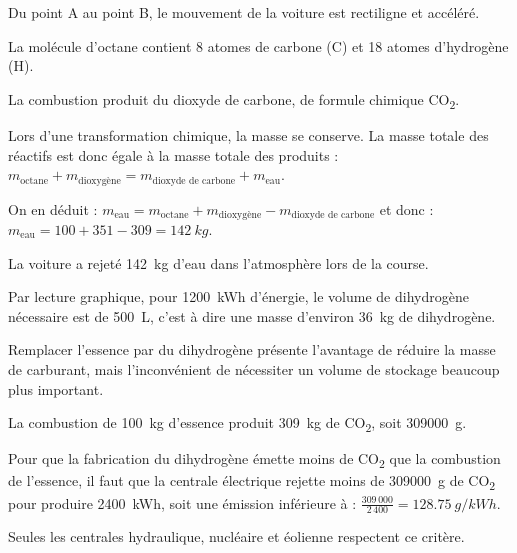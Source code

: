 \documentclass[11pt,a4paper]{article}
\begin{document}
\pagination
\titre

\q[1 point]
Du point A au point B, le mouvement de la voiture est rectiligne et accéléré.

\q[1 point]
La molécule d'octane contient 8 atomes de carbone (C) et 18 atomes d'hydrogène (H).

\q[1 point]
La combustion produit du dioxyde de carbone, de formule chimique CO\textsubscript{2}.

\q[2 points]
Lors d'une transformation chimique, la masse se conserve. La masse totale des réactifs est donc égale à la masse totale des produits : $m_\text{octane} + m_\text{dioxygène} = m_\text{dioxyde de carbone} + m_\text{eau}$.

On en déduit : $m_\text{eau} = m_\text{octane} + m_\text{dioxygène} - m_\text{dioxyde de carbone}$ et donc : $m_\text{eau} = 100 + 351 - 309 = \SI{142}{kg}$.

La voiture a rejeté \SI{142}{kg} d'eau dans l'atmosphère lors de la course.

\q[1,5 points]
Par lecture graphique, pour \SI{1200}{kWh} d'énergie, le volume de dihydrogène nécessaire est de \SI{500}{L}, c'est à dire une masse d'environ \SI{36}{kg} de dihydrogène.

\q[1 point]
Remplacer l'essence par du dihydrogène présente l'avantage de réduire la masse de carburant, mais l'inconvénient de nécessiter un volume de stockage beaucoup plus important.

\q[2,5 points]
La combustion de \SI{100}{kg} d'essence produit \SI{309}{kg} de CO\textsubscript{2}, soit \SI{309000}{g}.

Pour que la fabrication du dihydrogène émette moins de CO\textsubscript{2} que la combustion de l'essence, il faut que la centrale électrique rejette moins de \SI{309000}{g} de CO\textsubscript{2} pour produire \SI{2400}{kWh}, soit une émission inférieure à : $\frac{309\,000}{2\,400} = \SI{128,75}{g/kWh}$.

Seules les centrales hydraulique, nucléaire et éolienne respectent ce critère.
\end{document}
